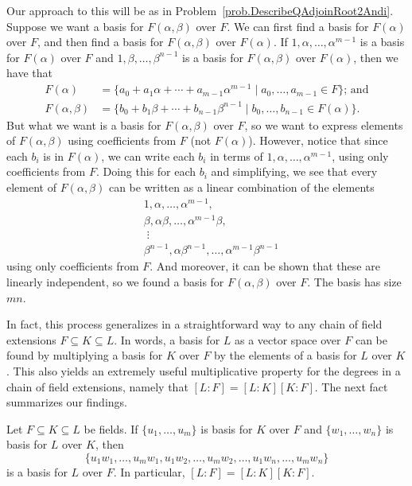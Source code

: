 Our approach to this will be as in Problem~\ref{prob.DescribeQAdjoinRoot2Andi}. Suppose we want a basis for $F(\alpha,\beta)$ over $F$. We can first find a basis for $F(\alpha)$ over $F$, and then find a basis for $F(\alpha,\beta)$ over $F(\alpha)$. If $1,\alpha,\ldots,\alpha^{m-1}$ is a basis for $F(\alpha)$ over $F$ and $1,\beta,\ldots,\beta^{n-1}$ is a basis for $F(\alpha,\beta)$ over $F(\alpha)$, then we have that 
\begin{align*}
F(\alpha) &= \{a_0+a_1\alpha+\cdots+a_{m-1}\alpha^{m-1}\mid a_0,\ldots,a_{m-1} \in F\}\text{; and}\\
F(\alpha,\beta) &= \{b_0+b_1\beta+\cdots+b_{n-1}\beta^{n-1}\mid b_0,\ldots,b_{n-1}\in F(\alpha)\}.
\end{align*}
But what we want is a basis for $F(\alpha,\beta)$ over $F$, so we want to express elements of $F(\alpha,\beta)$ using coefficients from $F$ (not $F(\alpha)$). However, notice that since each $b_i$ is in $F(\alpha)$, we can write each $b_i$ in terms of $1,\alpha,\ldots,\alpha^{m-1}$, using only coefficients from $F$. Doing this for each $b_i$ and simplifying, we see that every element of $F(\alpha,\beta)$ can be written as a linear combination of the elements
\begin{align*}
&1,\alpha,\ldots, \alpha^{m-1},\\ 
&\beta,\alpha\beta,\ldots, \alpha^{m-1}\beta,\\
&\;\vdots\\
&\beta^{n-1},\alpha\beta^{n-1},\ldots, \alpha^{m-1}\beta^{n-1}
\end{align*}
using only coefficients from $F$. And moreover, it can be shown that these are linearly independent, so we found a basis for $F(\alpha,\beta)$ over $F$. The basis has size $mn$.

In fact, this process generalizes in a straightforward way to any chain of field extensions $F\subseteq K \subseteq L$. In words, a basis for $L$ as a vector space over $F$ can be found by multiplying a basis for $K$ over $F$ by the elements of a basis for $L$ over $K$. This also yields an extremely useful multiplicative property for the degrees in a chain of field extensions, namely that $[L:F] = [L:K][K:F]$. The next fact summarizes our findings.

\begin{fact}\label{thm.BasisChainExtensionField}
Let $F\subseteq K \subseteq L$ be fields. If $\{u_1,\ldots,u_m\}$ is basis for $K$ over $F$ and $\{w_1,\ldots,w_n\}$ is basis for $L$ over $K$, then 
\[ \{u_1w_1,\ldots,u_mw_1,u_1w_2,\ldots,u_mw_2,\ldots,u_1w_n,\ldots,u_mw_n\}\]
is a basis for $L$ over $F$. In particular, $[L:F] = [L:K][K:F]$.
\end{fact}

